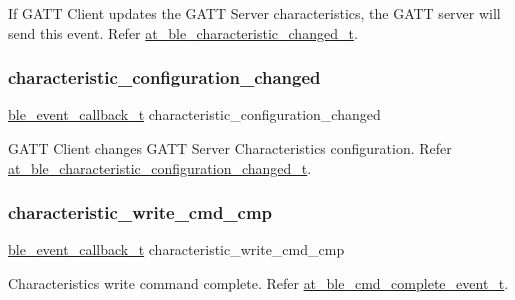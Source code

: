 If G\+A\+TT Client updates the G\+A\+TT Server characteristics, the G\+A\+TT server will send this event. Refer \mbox{\hyperlink{structat__ble__characteristic__changed__t}{at\+\_\+ble\+\_\+characteristic\+\_\+changed\+\_\+t}}. 

\mbox{\label{structble__gatt__server__event__cb_a9045a6f37cec8cb9bfd83567f653651a}} 
\subsubsection{\texorpdfstring{characteristic\_configuration\_changed}{characteristic\_configuration\_changed}}
{\footnotesize\ttfamily \mbox{\hyperlink{ble__manager_8h_a04ce4bb8cb8282f2762e3924b1773cc9}{ble\+\_\+event\+\_\+callback\+\_\+t}} characteristic\+\_\+configuration\+\_\+changed}



G\+A\+TT Client changes G\+A\+TT Server Characteristics configuration. Refer \mbox{\hyperlink{structat__ble__characteristic__configuration__changed__t}{at\+\_\+ble\+\_\+characteristic\+\_\+configuration\+\_\+changed\+\_\+t}}. 

\mbox{\label{structble__gatt__server__event__cb_a22defb4fe6f795a56b10cb020dfa4272}} 
\subsubsection{\texorpdfstring{characteristic\_write\_cmd\_cmp}{characteristic\_write\_cmd\_cmp}}
{\footnotesize\ttfamily \mbox{\hyperlink{ble__manager_8h_a04ce4bb8cb8282f2762e3924b1773cc9}{ble\+\_\+event\+\_\+callback\+\_\+t}} characteristic\+\_\+write\+\_\+cmd\+\_\+cmp}



Characteristics write command complete. Refer \mbox{\hyperlink{structat__ble__cmd__complete__event__t}{at\+\_\+ble\+\_\+cmd\+\_\+complete\+\_\+event\+\_\+t}}. 

